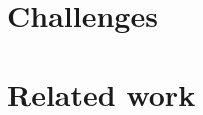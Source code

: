 \documentclass{phd-thesis}
\begin{document}
\chapter{Challenges}\label{sec:chall}


\chapter{Related work}\label{sec:related}




\appendix


%


\backmatter

\printindex
\end{document}
